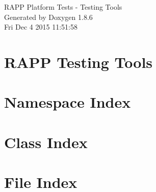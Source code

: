\documentclass[twoside]{book}
\newcommand{\clearemptydoublepage}{%
  \newpage{\pagestyle{empty}\cleardoublepage}%
}
\begin{document}
\hypersetup{pageanchor=false}
\begin{titlepage}
\vspace*{7cm}
\begin{center}%
{\Large R\-A\-P\-P Platform Tests -\/ Testing Tools }\\
\vspace*{1cm}
{\large Generated by Doxygen 1.8.6}\\
\vspace*{0.5cm}
{\small Fri Dec 4 2015 11:51:58}\\
\end{center}
\end{titlepage}
\clearemptydoublepage
\tableofcontents
\clearemptydoublepage
{}
\hypersetup{pageanchor=true}

\chapter{R\-A\-P\-P Testing Tools}
\label{md__home_travis_rapp_temp_rapp-platform_rapp_testing_tools_README}
\hypertarget{md__home_travis_rapp_temp_rapp-platform_rapp_testing_tools_README}{}

\chapter{Namespace Index}

\chapter{Class Index}

\chapter{File Index}

\end{document}
